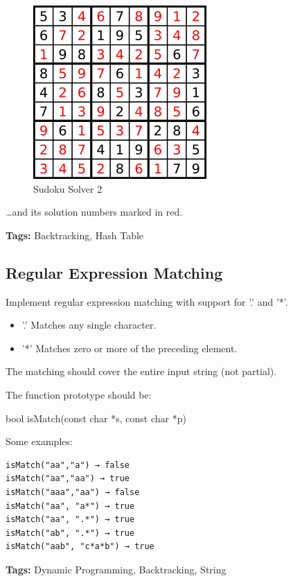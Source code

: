 \documentclass[11pt]{book}
\begin{document}
\begin{figure}[htb]
\centering
\includegraphics[width=.9\linewidth]{./pic/solveSudoku2.png}
\caption{Sudoku Solver 2}
\end{figure}
\ldots{}and its solution numbers marked in red.

\textbf{Tags:} Backtracking, Hash Table

\subsection{Regular Expression Matching}
\label{sec-16-4-10}
Implement regular expression matching with support for '.' and '*'.
\begin{itemize}
\item '.' Matches any single character.
\item '*' Matches zero or more of the preceding element.
\end{itemize}

The matching should cover the entire input string (not partial).

The function prototype should be:

bool isMatch(const char *s, const char *p)

Some examples:
\lstset{language=java,label= ,caption= ,numbers=none}
\begin{lstlisting}
isMatch("aa","a") → false
isMatch("aa","aa") → true
isMatch("aaa","aa") → false
isMatch("aa", "a*") → true
isMatch("aa", ".*") → true
isMatch("ab", ".*") → true
isMatch("aab", "c*a*b") → true
\end{lstlisting}
\textbf{Tags:} Dynamic Programming, Backtracking, String
\end{document}
